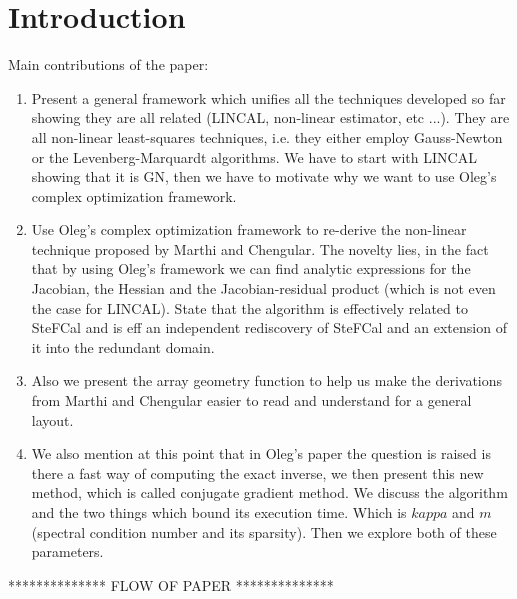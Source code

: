 \documentclass[useAMS,usenatbib]{mn2e}
\begin{document}
\section{Introduction}

Main contributions of the paper:

\begin{enumerate}
 \item Present a general framework which unifies all the techniques developed so far showing they are all related (LINCAL, non-linear estimator, etc ...). They are all non-linear
 least-squares techniques, i.e. they either employ Gauss-Newton or the Levenberg-Marquardt algorithms. We have to start with LINCAL showing that it is GN, then we have to motivate 
 why we want to use Oleg's complex optimization framework.
 \item Use Oleg's complex optimization framework to re-derive the non-linear technique proposed by Marthi and Chengular. The novelty lies, in the fact that by using Oleg's
 framework we can find analytic expressions for the Jacobian, the Hessian and the Jacobian-residual product (which is not even the case for LINCAL). State that the algorithm is 
 effectively related to SteFCal and is eff an independent rediscovery of SteFCal and an extension of it into the redundant domain.
 \item Also we present the array geometry function to help us make the derivations from Marthi and Chengular easier to read and understand for a general layout.
 \item We also mention at this point that in Oleg's paper the question is raised is there a fast way of computing the exact inverse, we then present this new method, which is called
 conjugate gradient method. We discuss the algorithm and the two things which bound its execution time. Which is $kappa$ and $m$ (spectral condition number and its sparsity). Then
 we explore both of these parameters.
 \end{enumerate}
 
 **************
 FLOW OF PAPER
 **************
 
\end{document}
